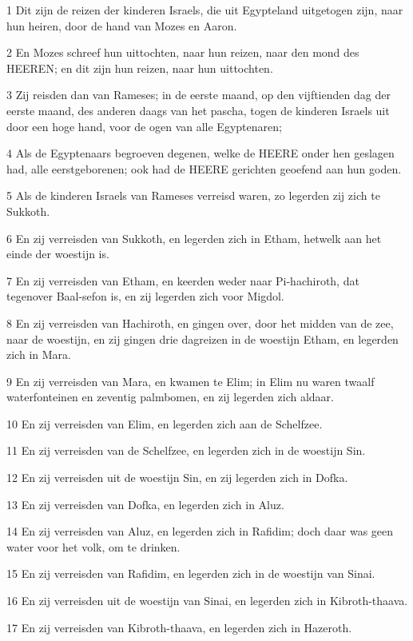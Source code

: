 \par 1 Dit zijn de reizen der kinderen Israels, die uit Egypteland uitgetogen zijn, naar hun heiren, door de hand van Mozes en Aaron.
\par 2 En Mozes schreef hun uittochten, naar hun reizen, naar den mond des HEEREN; en dit zijn hun reizen, naar hun uittochten.
\par 3 Zij reisden dan van Rameses; in de eerste maand, op den vijftienden dag der eerste maand, des anderen daags van het pascha, togen de kinderen Israels uit door een hoge hand, voor de ogen van alle Egyptenaren;
\par 4 Als de Egyptenaars begroeven degenen, welke de HEERE onder hen geslagen had, alle eerstgeborenen; ook had de HEERE gerichten geoefend aan hun goden.
\par 5 Als de kinderen Israels van Rameses verreisd waren, zo legerden zij zich te Sukkoth.
\par 6 En zij verreisden van Sukkoth, en legerden zich in Etham, hetwelk aan het einde der woestijn is.
\par 7 En zij verreisden van Etham, en keerden weder naar Pi-hachiroth, dat tegenover Baal-sefon is, en zij legerden zich voor Migdol.
\par 8 En zij verreisden van Hachiroth, en gingen over, door het midden van de zee, naar de woestijn, en zij gingen drie dagreizen in de woestijn Etham, en legerden zich in Mara.
\par 9 En zij verreisden van Mara, en kwamen te Elim; in Elim nu waren twaalf waterfonteinen en zeventig palmbomen, en zij legerden zich aldaar.
\par 10 En zij verreisden van Elim, en legerden zich aan de Schelfzee.
\par 11 En zij verreisden van de Schelfzee, en legerden zich in de woestijn Sin.
\par 12 En zij verreisden uit de woestijn Sin, en zij legerden zich in Dofka.
\par 13 En zij verreisden van Dofka, en legerden zich in Aluz.
\par 14 En zij verreisden van Aluz, en legerden zich in Rafidim; doch daar was geen water voor het volk, om te drinken.
\par 15 En zij verreisden van Rafidim, en legerden zich in de woestijn van Sinai.
\par 16 En zij verreisden uit de woestijn van Sinai, en legerden zich in Kibroth-thaava.
\par 17 En zij verreisden van Kibroth-thaava, en legerden zich in Hazeroth.
